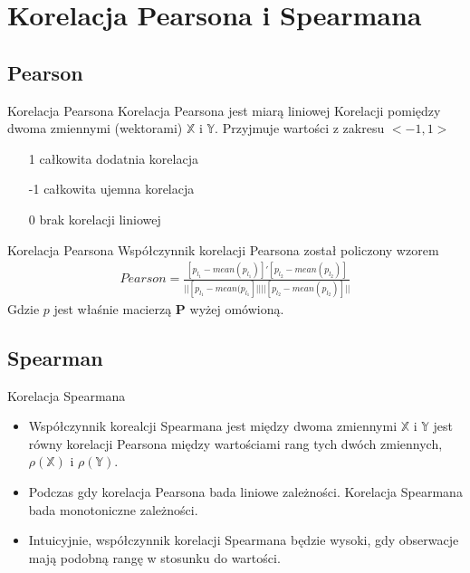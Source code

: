\documentclass{beamer}
\begin{document}
\section{Korelacja Pearsona i Spearmana}
\subsection{Pearson}
\begin{frame}{Korelacja Pearsona}
Korelacja Pearsona jest miarą liniowej Korelacji pomiędzy dwoma zmiennymi (wektorami) $\mathbb{X}$ i $\mathbb{Y}$. Przyjmuje wartości z zakresu $<-1,1>$
\pause
\begin{itemize}
\item[1] całkowita dodatnia korelacja
\item[-1] całkowita ujemna korelacja
\item[0] brak korelacji liniowej
\end{itemize}

\end{frame}
\begin{frame}{Korelacja Pearsona}
Współczynnik korelacji Pearsona został policzony wzorem
\begin{align*}
\textit{Pearson}=
\frac{[p_{l_1} - \textit{mean}(p_{l_1})]'[p_{l_2} - \textit{mean}(p_{l_2})]}{||[p_{l_1} - \textit{mean}(p_{l_1}]||||[p_{l_2} - \textit{mean}(p_{l_2})]||}
\end{align*}
Gdzie $p$ jest właśnie macierzą \textbf{P} wyżej omówioną.
\end{frame}
\subsection{Spearman}
\begin{frame}{Korelacja Spearmana}
\begin{itemize}


\item<1> Współczynnik korealcji Spearmana jest między dwoma zmiennymi $\mathbb{X}$ i $\mathbb{Y}$ jest równy korelacji Pearsona między wartościami rang tych dwóch zmiennych, $\rho(\mathbb{X})$ i $\rho(\mathbb{Y})$.
\item<2>Podczas gdy korelacja Pearsona bada liniowe zależności. Korelacja Spearmana bada monotoniczne zależności.

\item<3>Intuicyjnie, współczynnik korelacji Spearmana będzie wysoki, gdy obserwacje mają podobną rangę w stosunku do wartości. 
\end{itemize}
\end{frame}
\end{document}
